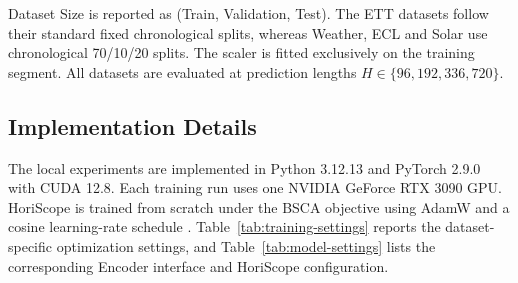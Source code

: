 \begin{table}[t]
\centering
\scriptsize
\setlength{\tabcolsep}{4pt}
\caption{Dataset Statistics.}
\label{tab:dataset-statistics}
\end{table}


Dataset Size is reported as (Train, Validation, Test). The ETT datasets follow their standard fixed chronological splits, whereas Weather, ECL and Solar use chronological 70/10/20 splits. The scaler is fitted exclusively on the training segment. All datasets are evaluated at prediction lengths $H\in\{96,192,336,720\}$.

\subsection{Implementation Details}


The local experiments are implemented in Python 3.12.13 and PyTorch 2.9.0 with CUDA 12.8. Each training run uses one NVIDIA GeForce RTX 3090 GPU. HoriScope is trained from scratch under the BSCA objective using AdamW and a cosine learning-rate schedule \citep{loshchilov2019adamw,loshchilov2017sgdr}. Table~\ref{tab:training-settings} reports the dataset-specific optimization settings, and Table~\ref{tab:model-settings} lists the corresponding Encoder interface and HoriScope configuration.

